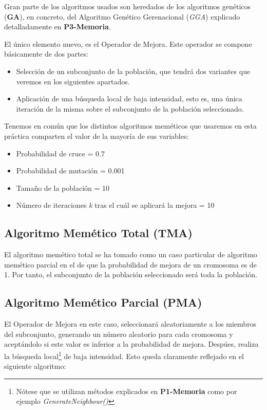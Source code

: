 \documentclass[a4paper, 11pt]{article}
\begin{document}
			Gran parte de los algoritmos usados son heredados de los algoritmos genéticos (\textbf{GA}),
			en concreto, del Algoritmo Genético Gerenacional (\textit{GGA}) explicado detalladamente en
			\textbf{P3-Memoria}.
			
			El único elemento nuevo, es el Operador de Mejora. Este operador se compone básicamente
			de dos partes:
			\begin{itemize}
				\item Selección de un subconjunto de la población, que tendrá dos variantes que veremos
				en los siguientes apartados.
				\item Aplicación de una búsqueda local de baja intensidad, esto es, una única iteración
				de la misma sobre el subconjunto de la población seleccionado.
			\end{itemize}
			
			Tenemos en común que los distintos algoritmos meméticos que usaremos en esta práctica comparten
			el valor de la mayoría de sus variables:
			\begin{itemize}
				\item Probabilidad de cruce = 0.7
				\item Probabilidad de mutación = 0.001
				\item Tamaño de la población = 10
				\item Número de iteraciones \textit{k} tras el cuál se aplicará la mejora = 10
			\end{itemize}
			
		\subsection{Algoritmo Memético Total (\textbf{TMA})}
			El algoritmo memético total se ha tomado como un caso particular de algoritmo memético parcial
			en el de que la probabilidad de mejora de un cromosoma es de 1. Por tanto, el subconjunto
			de la población seleccionado será toda la población.
		
		\subsection{Algoritmo Memético Parcial (\textbf{PMA})}
			El Operador de Mejora en este caso, seleccionará aleatoriamente a los miembros del subconjunto,
			generando un número aleatorio para cada cromosoma y aceptándolo si este valor es inferior a
			la probabilidad de mejora. Despúes, realiza la búsqueda local\footnote{Nótese que se utilizan
			métodos explicados en \textbf{P1-Memoria} como por ejemplo \textit{GenerateNeighbour()}} de
			baja intensidad. Esto queda claramente reflejado en el siguiente algoritmo:
			
\end{document}
